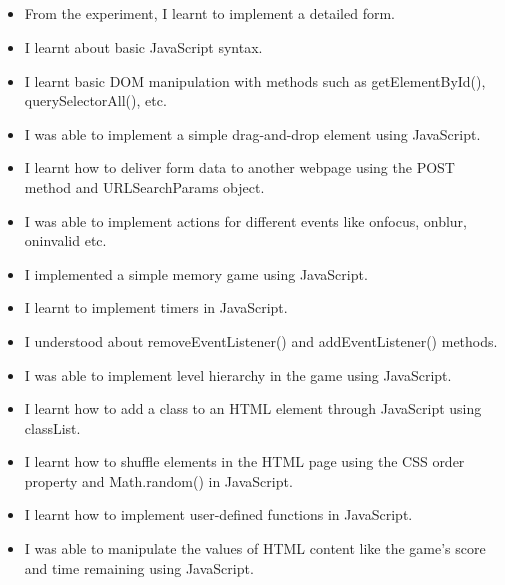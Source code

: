 \documentclass[12pt, a4]{article}
\begin{document}
\subsection*{}
\begin{itemize}

\item From the experiment, I learnt to implement a detailed form.
\item I learnt about basic JavaScript syntax.
\item I learnt basic DOM manipulation with methods such as getElementById(), querySelectorAll(), etc.
\item I was able to implement a simple drag-and-drop element using JavaScript.
\item I learnt how to deliver form data to another webpage using the POST method and URLSearchParams object.
\item I was able to implement actions for different events like onfocus, onblur, oninvalid etc.
\item I implemented a simple memory game using JavaScript.
\item I learnt to implement timers in JavaScript.
\item I understood about removeEventListener() and addEventListener() methods.
\item I was able to implement level hierarchy in the game using JavaScript.
\item I learnt how to add a class to an HTML element through JavaScript using classList.
\item I learnt how to shuffle elements in the HTML page using the CSS order property and Math.random() in JavaScript.
\item I learnt how to implement user-defined functions in JavaScript.
\item I was able to manipulate the values of HTML content like the game's score and time remaining using JavaScript.

\end{itemize}
\end{document}
